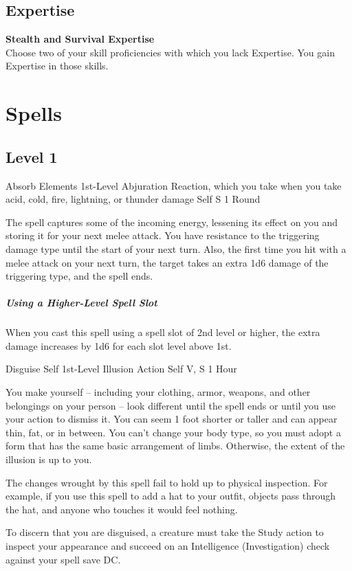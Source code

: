 \documentclass[letterpaper,openany,oneside,twocolumn]{book}
\begin{document}
\subsection*{Expertise}
\textbf{Stealth and Survival Expertise}\\
Choose two of your skill proficiencies with which you lack Expertise. You gain Expertise in those skills.

\section*{Spells}
\subsection*{Level 1}

\DndSpellHeader
  {Absorb Elements}
  {1st-Level Abjuration}
  {Reaction, which you take when you take acid, cold, fire, lightning, or thunder damage}
  {Self}
  {S}
  {1 Round}

The spell captures some of the incoming energy, lessening its effect on you and storing it for your next melee attack. You have resistance to the triggering damage type until the start of your next turn. Also, the first time you hit with a melee attack on your next turn, the target takes an extra 1d6 damage of the triggering type, and the spell ends.

\subparagraph*{Using a Higher-Level Spell Slot} When you cast this spell using a spell slot of 2nd level or higher, the extra damage increases by 1d6 for each slot level above 1st.

\DndSpellHeader
  {Disguise Self}
  {1st-Level Illusion}
  {Action}
  {Self}
  {V, S}
  {1 Hour}

You make yourself – including your clothing, armor, weapons, and other belongings on your person – look different until the spell ends or until you use your action to dismiss it. You can seem 1 foot shorter or taller and can appear thin, fat, or in between. You can't change your body type, so you must adopt a form that has the same basic arrangement of limbs. Otherwise, the extent of the illusion is up to you.

The changes wrought by this spell fail to hold up to physical inspection. For example, if you use this spell to add a hat to your outfit, objects pass through the hat, and anyone who touches it would feel nothing.

To discern that you are disguised, a creature must take the Study action to inspect your appearance and succeed on an Intelligence (Investigation) check against your spell save DC.
\end{document}
